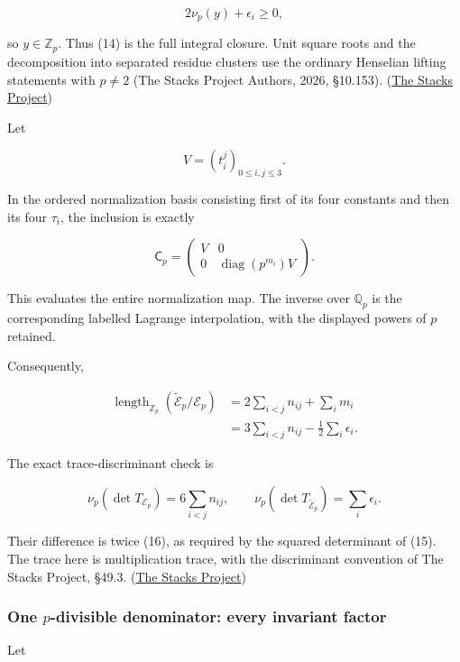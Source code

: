 \[
2\nu_p(y)+\epsilon_i\ge0,
\]

so \(y\in\mathbb Z_p\). Thus (14) is the full integral closure. Unit
square roots and the decomposition into separated residue clusters use
the ordinary Henselian lifting statements with \(p\ne2\) (The Stacks
Project Authors, 2026, §10.153).
(\href{https://stacks.math.columbia.edu/tag/04GE}{The Stacks Project})

Let

\[
V=(t_i^j)_{0\le i,j\le3}.
\]

In the ordered normalization basis consisting first of its four
constants and then its four \(\tau_i\), the inclusion is exactly

\[
\boxed{
\mathsf C_p=
\begin{pmatrix}
V&0\\
0&\operatorname{diag}(p^{m_i})V
\end{pmatrix}.
}
\tag{15}
\]

This evaluates the entire normalization map. The inverse over
\(\mathbb Q_p\) is the corresponding labelled Lagrange interpolation,
with the displayed powers of \(p\) retained.

Consequently,

\[
\boxed{
\begin{aligned}
\operatorname{length}_{\mathbb Z_p}
(\widetilde{\mathscr E}_p/\mathscr E_p)
&=
2\sum_{i<j}n_{ij}+\sum_i m_i\\
&=
3\sum_{i<j}n_{ij}
-\frac12\sum_i\epsilon_i.
\end{aligned}}
\tag{16}
\]

The exact trace-discriminant check is

\[
\nu_p(\det T_{\mathscr E_p})=6\sum_{i<j}n_{ij},
\qquad
\nu_p(\det T_{\widetilde{\mathscr E}_p})
=\sum_i\epsilon_i.
\]

Their difference is twice (16), as required by the squared determinant
of (15). The trace here is multiplication trace, with the discriminant
convention of The Stacks Project, §49.3.
(\href{https://stacks.math.columbia.edu/tag/0BVH}{The Stacks Project})

\subsubsection{\texorpdfstring{One \(p\)-divisible denominator: every
invariant
factor}{One p-divisible denominator: every invariant factor}}\label{one-p-divisible-denominator-every-invariant-factor}

Let

